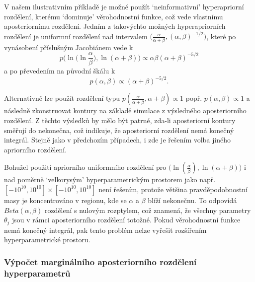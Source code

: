 V našem ilustrativním příkladě je možné použít `neinformativní' hyperapriorní rozdělení, kterému `dominuje' věrohodnostní funkce, což vede vlastnímu aposteriornímu rozdělení. Jedním z takovýchto možných hyperapriorních rozdělení je uniformní rozdělení nad intervalem $\big(\frac{\alpha}{\alpha + \beta}, (\alpha, \beta)^{-1/2} \big)$, které po vynásobení příslušným Jacobiánem vede k
\begin{equation}
p \Big(\ln \big(\ln \frac{\alpha}{\beta}\big), \ln(\alpha + \beta) \Big) \varpropto \alpha \beta (\alpha + \beta)^{-5/2}
\end{equation}
a po převedením na původní škálu k
\begin{equation}
p(\alpha, \beta) \varpropto (\alpha + \beta)^{-5/2}.
\end{equation}

Alternativně lze použít rozdělení typu $p(\frac{\alpha}{\alpha + \beta}, \alpha + \beta) \varpropto 1$ popř. $p(\alpha, \beta) \varpropto 1$ a následně zkonstruovat kontury na základě simulace z výsledného aposteriorního rozdělení. Z těchto výsledků by mělo být patrné, zda-li aposteriorní kontury směřují do nekonečna, což indikuje, že aposteriorní rozdělení nemá konečný integrál. Stejně jako v předchozím případech, i zde je řešením volba jiného apriorního rozdělení.

Bohužel použití apriorního uniformního rozdělení pro $\big(\ln(\frac{\alpha}{\beta}), \ln(\alpha + \beta) \big)$ i nad poměrně `velkorysým' hyperparametrickým prostorem jako např. $[-10^{10}, 10^{10}] \times [-10^{10}, 10^{10}]$ není řešením, protože většina pravděpodobnostní masy je koncentrováno v regionu, kde se $\alpha$ a $\beta$ blíží nekonečnu. To odpovídá $\textit{Beta}(\alpha, \beta)$ rozdělení s nulovým rozptylem, což znamená, že všechny parametry $\theta_j$  jsou v rámci aposteriorního rozdělení totožné. Pokud věrohodnostní funkce nemá konečný integrál, pak tento problém nelze vyřešit rozšířením hyperparametrické prostoru.

\subsubsection{Výpočet marginálního aposteriorního rozdělení hyperparametrů}

